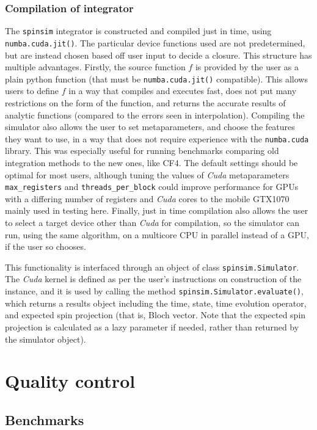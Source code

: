 \documentclass{jors}
\begin{document}
	
		\subsubsection*{Compilation of integrator}
			The \texttt{spinsim} integrator is constructed and compiled just in time, using \texttt{numba.cuda.jit()}. The particular device functions used are not predetermined, but are instead chosen based off user input to decide a closure. This structure has multiple advantages. Firstly, the source function \(f\) is provided by the user as a plain python function (that must be \texttt{numba.cuda.jit()} compatible). This allows users to define \(f\) in a way that compiles and executes fast, does not put many restrictions on the form of the function, and returns the accurate results of analytic functions (compared to the errors seen in interpolation). Compiling the simulator also allows the user to set metaparameters, and choose the features they want to use, in a way that does not require experience with the \texttt{numba.cuda} library. This was especially useful for running benchmarks comparing old integration methods to the new ones, like CF4. The default settings should be optimal for most users, although tuning the values of \emph{Cuda} metaparameters \texttt{max\_registers} and \texttt{threads\_per\_block} could improve performance for GPUs with a differing number of registers and \emph{Cuda} cores to the mobile GTX1070 mainly used in testing here. Finally, just in time compilation also allows the user to select a target device other than \emph{Cuda} for compilation, so the simulator can run, using the same algorithm, on a multicore CPU in parallel instead of a GPU, if the user so chooses.
			
			This functionality is interfaced through an object of class \texttt{spinsim.Simulator}. The \emph{Cuda} kernel is defined as per the user’s instructions on construction of the instance, and it is used by calling the method \texttt{spinsim.Simulator.evaluate()}, which returns a results object including the time, state, time evolution operator, and expected spin projection (that is, Bloch vector. Note that the expected spin projection is calculated as a lazy parameter if needed, rather than returned by the simulator object).

\section*{Quality control}
	\subsection*{Benchmarks}
\end{document}
